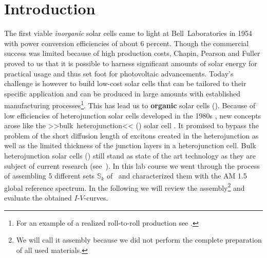 
\section*{Introduction}%

The first viable \textit{inorganic} solar cells came to light at Bell~Laboratories in 1954 \cite{siliconSC_1}\cite{siliconSC_2} with power conversion efficiencies of about 6 percent. Though the commercial success was limited because of high production costs, Chapin, Pearson and Fuller proved to us that it is possible to harness significant amounts of solar energy for practical usage and thus set foot for photovoltaic advancements.\mypar
Today's challenge is however to build low-cost solar cells that can be tailored to their specific application and can be produced in large amounts with established manufacturing processes\footnote{For an example of a realized roll-to-roll production see \cite{rolltoroll}.}. This has lead us to \textbf{organic} solar cells (\OSC).\mypar
Because of low efficiencies of heterojunction solar cells developed in the 1980s \cite{tang}, new concepts arose like the >>bulk~heterojunction<< (\BHJ) solar cell \cite{heterojunk}. It promised to bypass the problem of the short diffusion length of excitons created in the heterojunction as well as the limited thickness of the junction layers in a heterojunction cell.\mypar
Bulk heterojunction solar cells (\BHSC) still stand as state of the art technology as they are subject of current research (see~\cite{modernbulkhetero}). In this lab course we went through the process of assembling 5 different sets $\mathbb{S}_k$ of \BHSC\ and characterized them with the {\os\sefo AM 1.5} global reference spectrum. In the following we will review the assembly\footnote{We will call it assembly because we did not perform the complete preparation of all used materials.} and evaluate the obtained $I$-$V$-curves.

